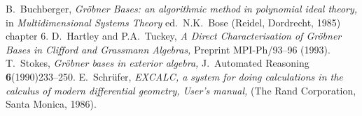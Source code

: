 \begin{thebibliography}{M}

        B.~Buchberger, {\em
        Gr\"obner Bases: an algorithmic method in polynomial ideal theory,}
        in {\em Multidimensional Systems Theory\/} ed.~N.K.~Bose
        (Reidel, Dordrecht, 1985) chapter 6.
        D.~Hartley and P.A.~Tuckey, {\em
        A Direct Characterisation of Gr\"obner Bases in Clifford and
        Grassmann Algebras,}
        Preprint MPI-Ph/93--96 (1993).
        T.~Stokes, {\em
        Gr\"obner bases in exterior algebra,}
        J.~Automated Reasoning {\bf 6}(1990)233--250.
        E.~Schr\"ufer, {\em
        EXCALC, a system for doing calculations in the calculus of modern
        differential geometry, User's manual,}
        (The Rand Corporation, Santa Monica, 1986).

\end{thebibliography}


